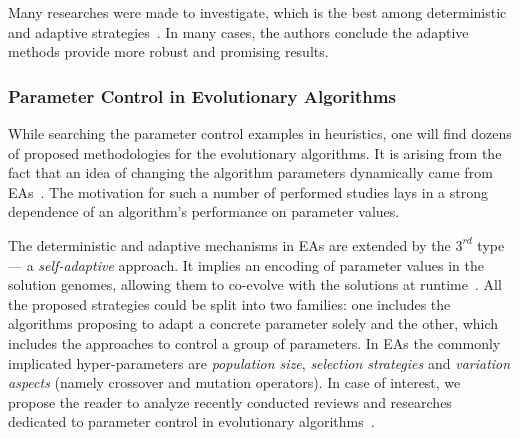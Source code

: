 Many researches were made to investigate, which is the best among deterministic and adaptive strategies~\cite{thompson1995general,ingber2000adaptive,de2003placement,azizi2004adaptive,lou2016parallel}. In many cases, the authors conclude the adaptive methods provide more robust and promising results.


\subsubsection{Parameter Control in Evolutionary Algorithms}
While searching the parameter control examples in heuristics, one will find dozens of proposed methodologies for the evolutionary algorithms. It is arising from the fact that an idea of changing the algorithm parameters dynamically came from EAs~\cite{karafotias2014parameter}. The motivation for such a number of performed studies lays in a strong dependence of an algorithm's performance on parameter values. 

The deterministic and adaptive mechanisms in EAs are extended by the $3^{rd}$ type — a \emph{self-adaptive} approach. It implies an encoding of parameter values in the solution genomes, allowing them to co-evolve with the solutions at runtime~\cite{doerr2020theory}. All the proposed strategies could be split into two families: one includes the algorithms proposing to adapt a concrete parameter solely and the other, which includes the approaches to control a group of parameters. In EAs the commonly implicated hyper-parameters are \emph{population size}, \emph{selection strategies} and \emph{variation aspects} (namely crossover and mutation operators). In case of interest, we propose the reader to analyze recently conducted reviews and researches dedicated to parameter control in evolutionary algorithms~\cite{karafotias2014parameter,aleti2016systematic,smith2020self,doerr2020theory}.

